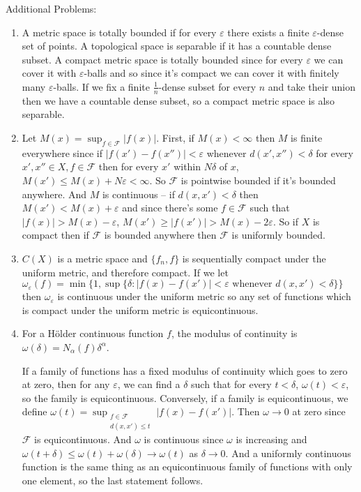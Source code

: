 \documentclass{article}
\newcommand\F{\mathscr F}
\begin{document}
\pagebreak
\noindent Additional Problems:
\begin{enumerate}
   \item A metric space is totally bounded if for every $\varepsilon$ there
      exists a finite $\varepsilon$-dense set of points. A topological space is
      separable if it has a countable dense subset. A compact metric space is
      totally bounded since for every $\varepsilon$ we can cover it with
      $\varepsilon$-balls and so since it's compact we can cover it with
      finitely many $\varepsilon$-balls. If we fix a finite $\frac1n$-dense
      subset for every $n$ and take their union then we have a countable dense
      subset, so a compact metric space is also separable.

   \item Let $M(x) = \sup_{f \in \F} |f(x)|$. First, if $M(x) < \infty$ then $M$
      is finite everywhere since if $|f(x')-f(x'')| < \varepsilon$ whenever
      $d(x',x'') < \delta$ for every $x',x'' \in X, f \in \F$ then for every
      $x'$ within $N\delta$ of $x$, $M(x') \leq M(x) + N\varepsilon < \infty$.
      So $\F$ is pointwise bounded if it's bounded anywhere. And $M$ is
      continuous -- if $d(x,x') < \delta$ then $M(x') < M(x) + \varepsilon$ and
      since there's some $f \in \F$ such that $|f(x)| > M(x) - \varepsilon$,
      $M(x') \geq |f(x')| > M(x) - 2\varepsilon$. So if $X$ is compact then if
      $\F$ is bounded anywhere then $\F$ is uniformly bounded.

   \item $C(X)$ is a metric space and $\{f_n,f\}$ is sequentially compact under
      the uniform metric, and therefore compact. If we let
      $\omega_\varepsilon(f) = \min\{1,\sup\{\delta : |f(x) - f(x')| <
         \varepsilon \textrm{ whenever } d(x,x') < \delta \}\}$ then
      $\omega_\varepsilon$ is continuous under the uniform metric so any set of
      functions which is compact under the uniform metric is equicontinuous.

   \item For a H\"older continuous function $f$, the modulus of continuity is
      $\omega(\delta) = N_\alpha(f)\delta^\alpha$.
      
      If a family of functions has a fixed modulus of continuity which goes to
      zero at zero, then for any $\varepsilon$, we can find a $\delta$ such that
      for every $t<\delta$, $\omega(t) < \varepsilon$, so the family is
      equicontinuous.  Conversely, if a family is equicontinuous, we define
      $\omega(t) = \displaystyle\sup_{\substack{f \in \F \\ d(x,x') \leq t}}
      |f(x) - f(x')|$. Then $\omega \to 0$ at zero since $\F$ is equicontinuous.
      And $\omega$ is continuous since $\omega$ is increasing and
      $\omega(t+\delta) \leq \omega(t)+\omega(\delta) \to \omega(t)$ as $\delta
      \to 0$. And a uniformly continuous function is the same thing as an
      equicontinuous family of functions with only one element, so the last
      statement follows.


\end{enumerate}
\end{document}
